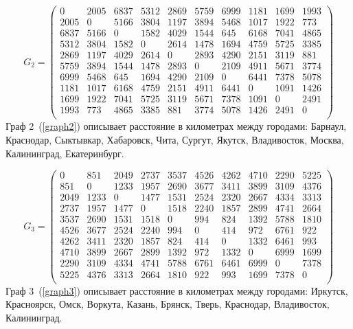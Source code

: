 \begin{equation}
	\label{graph2}
	G_{2} = \begin{pmatrix}
		0 & 2005 & 6837 & 5312 & 2869 & 5759 & 6999 & 1181 & 1699 & 1993 \\
		2005 & 0 & 5166 & 3804 & 1197 & 3894 & 5468 & 1017 & 1922 & 773 \\
		6837 & 5166 & 0 & 1582 & 4029 & 1544 & 645 & 6168 & 7041 & 4865 \\
		5312 & 3804 & 1582 & 0 & 2614 & 1478 & 1694 & 4759 & 5725 & 3385 \\
		2869 & 1197 & 4029 & 2614 & 0 & 2893 & 4290 & 2151 & 3119 & 881 \\
		5759 & 3894 & 1544 & 1478 & 2893 & 0 & 2109 & 4911 & 5671 & 3774 \\
		6999 & 5468 & 645 & 1694 & 4290 & 2109 & 0 & 6441 & 7378 & 5078 \\
		1181 & 1017 & 6168 & 4759 & 2151 & 4911 & 6441 & 0 & 1091 & 1426 \\
		1699 & 1922 & 7041 & 5725 & 3119 & 5671 & 7378 & 1091 & 0 & 2491 \\
		1993 & 773 & 4865 & 3385 & 881 & 3774 & 5078 & 1426 & 2491 & 0 \\
	\end{pmatrix}
\end{equation}
Граф 2~(\ref{graph2}) описывает расстояние в километрах между городами: Барнаул, Краснодар, Сыктывкар, Хабаровск, Чита, Сургут, Якутск, Владивосток, Москва, Калининград, Екатеринбург.

\begin{equation}
	\label{graph3}
	G_{3} = \begin{pmatrix}
		0 & 851 & 2049 & 2737 & 3537 & 4526 & 4262 & 4710 & 2290 & 5225 \\
		851 & 0 & 1233 & 1957 & 2690 & 3677 & 3411 & 3899 & 3109 & 4376 \\
		2049 & 1233 & 0 & 1477 & 1531 & 2524 & 2320 & 2667 & 4334 & 3313 \\
		2737 & 1957 & 1477 & 0 & 1518 & 2240 & 1857 & 2899 & 4741 & 2664 \\
		3537 & 2690 & 1531 & 1518 & 0 & 994 & 824 & 1392 & 5788 & 1810 \\
		4526 & 3677 & 2524 & 2240 & 994 & 0 & 414 & 972 & 6761 & 922 \\
		4262 & 3411 & 2320 & 1857 & 824 & 414 & 0 & 1332 & 6461 & 993 \\
		4710 & 3899 & 2667 & 2899 & 1392 & 972 & 1332 & 0 & 6999 & 1699 \\
		2290 & 3109 & 4334 & 4741 & 5788 & 6761 & 6461 & 6999 & 0 & 7378 \\
		5225 & 4376 & 3313 & 2664 & 1810 & 922 & 993 & 1699 & 7378 & 0 \\
	\end{pmatrix}
\end{equation}
Граф 3~(\ref{graph3}) описывает расстояние в километрах между городами: Иркутск, Красноярск, Омск, Воркута, Казань, Брянск, Тверь, Краснодар, Владивосток, Калининград.

